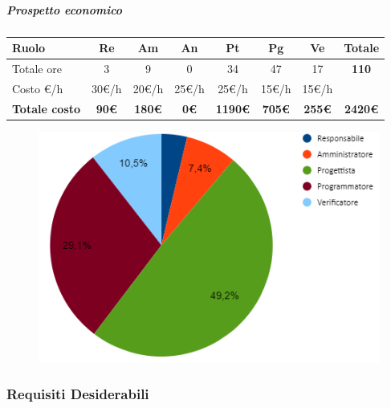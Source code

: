 \subparagraph{Prospetto economico}
\begin{center}
	\renewcommand{\arraystretch}{1.8} %
	\begin{tabular}{ |m{10em}|c|c|c|c|c|c|c| }
	\hline
	\textbf{Ruolo} & \textbf{Re} & \textbf{Am} &  \textbf{An} &  \textbf{Pt} &  \textbf{Pg} &  \textbf{Ve} &  \textbf{Totale}\\
    \hline
    Totale ore & 3 & 9 & 0 & 34 & 47 & 17 & \textbf{110}\\
    \hline
    Costo \euro/h & 30\euro/h & 20\euro/h & 25\euro/h & 25\euro/h & 15\euro/h & 15\euro/h & \\
    \hline
    \textbf{Totale costo} & \textbf{90\euro} & \textbf{180\euro} &  \textbf{0\euro} &  \textbf{1190\euro} &  \textbf{705\euro} &  \textbf{255\euro} &  \textbf{2420\euro}\\
    \hline
	\end{tabular}

    \begin{figure}[H]
       \centering\includegraphics{images/preventivo/PB-incremento2-costo.png}
    \end{figure}
\end{center}


\subsubsection{Requisiti Desiderabili}
